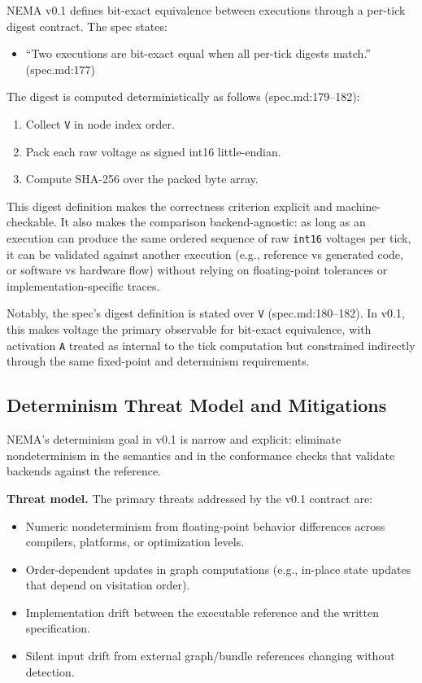 NEMA v0.1 defines bit-exact equivalence between executions through a per-tick digest contract. The spec states:
\begin{itemize}
\item ``Two executions are bit-exact equal when all per-tick digests match.'' (spec.md:177)
\end{itemize}

The digest is computed deterministically as follows (spec.md:179--182):
\begin{enumerate}
\item Collect \texttt{V} in node index order.
\item Pack each raw voltage as signed int16 little-endian.
\item Compute SHA-256 over the packed byte array.
\end{enumerate}

This digest definition makes the correctness criterion explicit and machine-checkable. It also makes the comparison backend-agnostic: as long as an execution can produce the same ordered sequence of raw \texttt{int16} voltages per tick, it can be validated against another execution (e.g., reference vs generated code, or software vs hardware flow) without relying on floating-point tolerances or implementation-specific traces.

Notably, the spec's digest definition is stated over \texttt{V} (spec.md:180--182). In v0.1, this makes voltage the primary observable for bit-exact equivalence, with activation \texttt{A} treated as internal to the tick computation but constrained indirectly through the same fixed-point and determinism requirements.

\subsection{Determinism Threat Model and Mitigations}

NEMA's determinism goal in v0.1 is narrow and explicit: eliminate nondeterminism in the semantics and in the conformance checks that validate backends against the reference.

\textbf{Threat model.} The primary threats addressed by the v0.1 contract are:
\begin{itemize}
\item Numeric nondeterminism from floating-point behavior differences across compilers, platforms, or optimization levels.
\item Order-dependent updates in graph computations (e.g., in-place state updates that depend on visitation order).
\item Implementation drift between the executable reference and the written specification.
\item Silent input drift from external graph/bundle references changing without detection.
\end{itemize}

